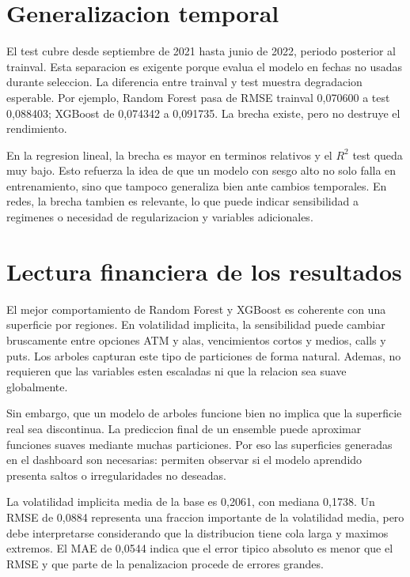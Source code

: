 \section{Generalizacion temporal}

El test cubre desde septiembre de 2021 hasta junio de 2022, periodo posterior al trainval. Esta separacion es exigente porque evalua el modelo en fechas no usadas durante seleccion. La diferencia entre trainval y test muestra degradacion esperable. Por ejemplo, Random Forest pasa de RMSE trainval 0,070600 a test 0,088403; XGBoost de 0,074342 a 0,091735. La brecha existe, pero no destruye el rendimiento.

En la regresion lineal, la brecha es mayor en terminos relativos y el $R^2$ test queda muy bajo. Esto refuerza la idea de que un modelo con sesgo alto no solo falla en entrenamiento, sino que tampoco generaliza bien ante cambios temporales. En redes, la brecha tambien es relevante, lo que puede indicar sensibilidad a regimenes o necesidad de regularizacion y variables adicionales.

\section{Lectura financiera de los resultados}

El mejor comportamiento de Random Forest y XGBoost es coherente con una superficie por regiones. En volatilidad implicita, la sensibilidad puede cambiar bruscamente entre opciones ATM y alas, vencimientos cortos y medios, calls y puts. Los arboles capturan este tipo de particiones de forma natural. Ademas, no requieren que las variables esten escaladas ni que la relacion sea suave globalmente.

Sin embargo, que un modelo de arboles funcione bien no implica que la superficie real sea discontinua. La prediccion final de un ensemble puede aproximar funciones suaves mediante muchas particiones. Por eso las superficies generadas en el dashboard son necesarias: permiten observar si el modelo aprendido presenta saltos o irregularidades no deseadas.

La volatilidad implicita media de la base es 0,2061, con mediana 0,1738. Un RMSE de 0,0884 representa una fraccion importante de la volatilidad media, pero debe interpretarse considerando que la distribucion tiene cola larga y maximos extremos. El MAE de 0,0544 indica que el error tipico absoluto es menor que el RMSE y que parte de la penalizacion procede de errores grandes.

